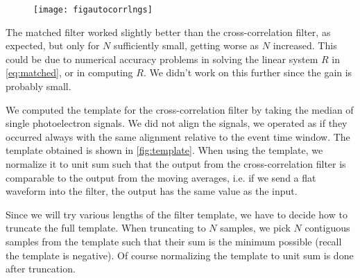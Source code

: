 
\begin{figure}
    \hspace{0.00\textwidth}
    \texttt{[image: figautocorrlngs]}
    

\end{figure}

The matched filter worked slightly better than the cross-correlation filter, as
expected, but only for $N$ sufficiently small, getting worse as $N$ increased.
This could be due to numerical accuracy problems in solving the linear system
$R$ in \autoref{eq:matched}, or in computing $R$. We didn't work on this
further since the gain is probably small.

We computed the template for the cross-correlation filter by taking the median
of single photoelectron signals. We did not align the signals, we operated as
if they occurred always with the same alignment relative to the event time
window. The template obtained is shown in \autoref{fig:template}. When using
the template, we normalize it to unit sum such that the output from the
cross-correlation filter is comparable to the output from the moving averages,
i.e. if we send a flat waveform into the filter, the output has the same value
as the input.



Since we will try various lengths of the filter template, we have to decide how
to truncate the full template. When truncating to $N$ samples, we pick $N$
contiguous samples from the template such that their sum is the minimum
possible (recall the template is negative). Of course normalizing the template
to unit sum is done after truncation.

